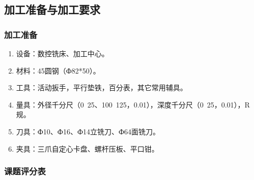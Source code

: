 \vfill
\subsection{加工准备与加工要求}
\subsubsection{加工准备}
\begin{enumerate}[1、]
	\item 设备：数控铣床、加工中心。
	\item 材料：45圆钢（Ф82*50）。
	\item 工具：活动扳手，平行垫铁，百分表，其它常用辅具。
	\item 
	量具：外径千分尺（0~25、100~125，0.01），深度千分尺（0~25，0.01），R规。
	\item 刀具：Ф10、Ф16、Ф14立铣刀、Ф64面铣刀。
	\item 夹具：三爪自定心卡盘、螺杆压板、平口钳。
\end{enumerate}
\subsubsection{课题评分表}


